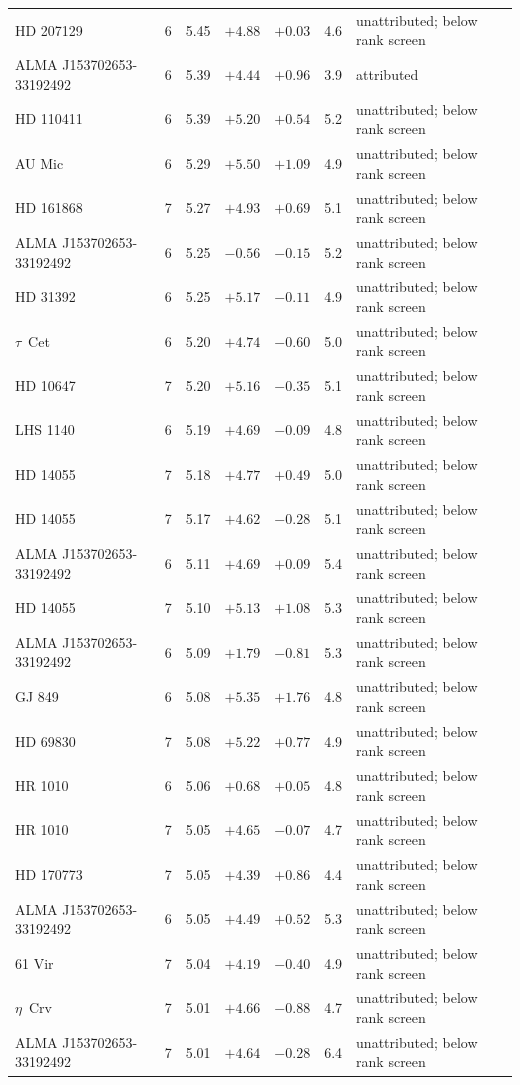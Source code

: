 \begin{tabular}{@{}llrrrrl@{}}
HD 207129 & 6 & 5.45 & $+4.88$ & $+0.03$ & 4.6 & unattributed; below rank screen \\
ALMA J153702653-33192492 & 6 & 5.39 & $+4.44$ & $+0.96$ & 3.9 & attributed \\
HD 110411 & 6 & 5.39 & $+5.20$ & $+0.54$ & 5.2 & unattributed; below rank screen \\
AU Mic & 6 & 5.29 & $+5.50$ & $+1.09$ & 4.9 & unattributed; below rank screen \\
HD 161868 & 7 & 5.27 & $+4.93$ & $+0.69$ & 5.1 & unattributed; below rank screen \\
ALMA J153702653-33192492 & 6 & 5.25 & $-0.56$ & $-0.15$ & 5.2 & unattributed; below rank screen \\
HD 31392 & 6 & 5.25 & $+5.17$ & $-0.11$ & 4.9 & unattributed; below rank screen \\
$\tau$~Cet & 6 & 5.20 & $+4.74$ & $-0.60$ & 5.0 & unattributed; below rank screen \\
HD 10647 & 7 & 5.20 & $+5.16$ & $-0.35$ & 5.1 & unattributed; below rank screen \\
LHS 1140 & 6 & 5.19 & $+4.69$ & $-0.09$ & 4.8 & unattributed; below rank screen \\
HD 14055 & 7 & 5.18 & $+4.77$ & $+0.49$ & 5.0 & unattributed; below rank screen \\
HD 14055 & 7 & 5.17 & $+4.62$ & $-0.28$ & 5.1 & unattributed; below rank screen \\
ALMA J153702653-33192492 & 6 & 5.11 & $+4.69$ & $+0.09$ & 5.4 & unattributed; below rank screen \\
HD 14055 & 7 & 5.10 & $+5.13$ & $+1.08$ & 5.3 & unattributed; below rank screen \\
ALMA J153702653-33192492 & 6 & 5.09 & $+1.79$ & $-0.81$ & 5.3 & unattributed; below rank screen \\
GJ 849 & 6 & 5.08 & $+5.35$ & $+1.76$ & 4.8 & unattributed; below rank screen \\
HD 69830 & 7 & 5.08 & $+5.22$ & $+0.77$ & 4.9 & unattributed; below rank screen \\
HR 1010 & 6 & 5.06 & $+0.68$ & $+0.05$ & 4.8 & unattributed; below rank screen \\
HR 1010 & 7 & 5.05 & $+4.65$ & $-0.07$ & 4.7 & unattributed; below rank screen \\
HD 170773 & 7 & 5.05 & $+4.39$ & $+0.86$ & 4.4 & unattributed; below rank screen \\
ALMA J153702653-33192492 & 6 & 5.05 & $+4.49$ & $+0.52$ & 5.3 & unattributed; below rank screen \\
61 Vir & 7 & 5.04 & $+4.19$ & $-0.40$ & 4.9 & unattributed; below rank screen \\
$\eta$~Crv & 7 & 5.01 & $+4.66$ & $-0.88$ & 4.7 & unattributed; below rank screen \\
ALMA J153702653-33192492 & 7 & 5.01 & $+4.64$ & $-0.28$ & 6.4 & unattributed; below rank screen \\
\bottomrule
\end{tabular}
